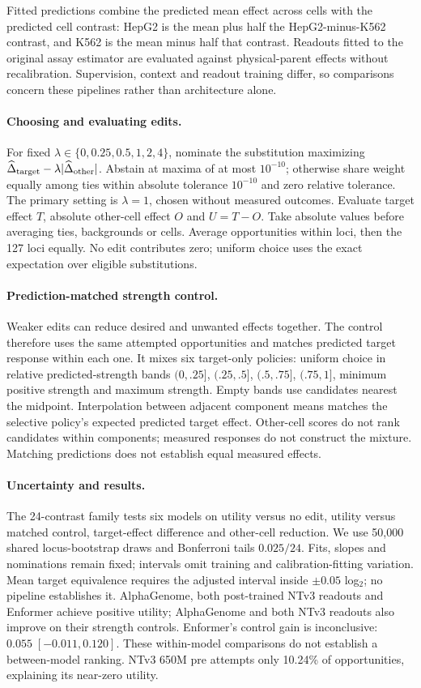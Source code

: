 Fitted predictions combine the predicted mean effect across cells with the predicted cell
contrast: HepG2 is the mean plus half the HepG2-minus-K562 contrast, and K562
is the mean minus half that contrast. Readouts fitted to the original
assay estimator are evaluated against physical-parent effects without recalibration.
Supervision, context and readout training differ, so comparisons concern these
pipelines rather than architecture alone.

\paragraph{Choosing and evaluating edits.}
For fixed $\lambda\in\{0,0.25,0.5,1,2,4\}$, nominate the substitution maximizing
$\widehat\Delta_{\rm target}-\lambda|\widehat\Delta_{\rm other}|$.
Abstain at maxima of at most $10^{-10}$; otherwise share weight equally among
ties within absolute tolerance $10^{-10}$ and zero relative tolerance.
The primary setting is $\lambda=1$, chosen without measured outcomes.
Evaluate target effect $T$, absolute other-cell effect $O$ and $U=T-O$.
Take absolute values before averaging ties, backgrounds or cells. Average
opportunities within loci, then the 127 loci equally. No edit contributes zero;
uniform choice uses the exact expectation over eligible substitutions.

\paragraph{Prediction-matched strength control.}
Weaker edits can reduce desired and unwanted effects together. The control
therefore uses the same attempted opportunities and matches predicted target
response within each one. It mixes six target-only policies: uniform choice
in relative predicted-strength bands $(0,.25]$, $(.25,.5]$, $(.5,.75]$, $(.75,1]$,
minimum positive strength and maximum strength. Empty bands use candidates
nearest the midpoint. Interpolation between adjacent component means matches
the selective policy's expected predicted target effect. Other-cell scores do
not rank candidates within components; measured responses do not construct the
mixture. Matching predictions does not establish equal measured effects.

\paragraph{Uncertainty and results.}
The 24-contrast family tests six models on utility versus no edit,
utility versus matched control, target-effect difference and other-cell reduction.
We use 50,000 shared locus-bootstrap draws and Bonferroni tails
$0.025/24$. Fits, slopes and nominations remain fixed; intervals omit training
and calibration-fitting variation. Mean target equivalence requires the adjusted
interval inside $\pm0.05$ log$_2$; no pipeline establishes it.
AlphaGenome, both post-trained NTv3 readouts and Enformer achieve positive utility;
AlphaGenome and both NTv3 readouts also improve on their strength controls.
Enformer's control gain is inconclusive: $0.055\;[-0.011,0.120]$.
These within-model comparisons do not establish a between-model ranking.
NTv3 650M pre attempts only 10.24\% of opportunities, explaining its near-zero utility.

